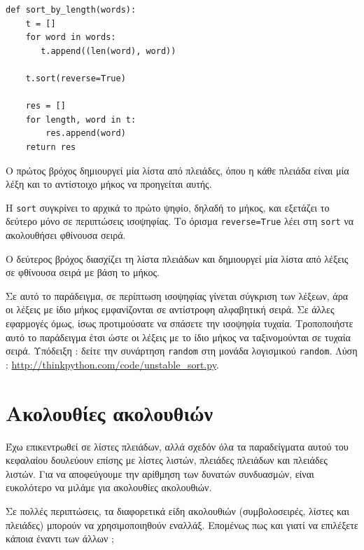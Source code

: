 \documentclass[10pt]{book}
\begin{document}
\begin{verbatim}
def sort_by_length(words):
    t = []
    for word in words:
       t.append((len(word), word))

    t.sort(reverse=True)

    res = []
    for length, word in t:
        res.append(word)
    return res
\end{verbatim}
%
 Ο πρώτος βρόχος δημιουργεί μία λίστα από πλειάδες, όπου η κάθε πλειάδα είναι μία λέξη και το αντίστοιχο μήκος να προηγείται αυτής.

Η  {\tt sort}  συγκρίνει το αρχικά το πρώτο ψηφίο, δηλαδή το μήκος, και εξετάζει το δεύτερο μόνο σε περιπτώσεις ισοψηφίας. Το όρισμα  {\tt reverse=True}  λέει στη  {\tt sort}  να ακολουθήσει φθίνουσα σειρά.

 Ο δεύτερος βρόχος διασχίζει τη λίστα πλειάδων και δημιουργεί μία λίστα από λέξεις σε φθίνουσα σειρά με βάση το μήκος.


\begin{exercise}

Σε αυτό το παράδειγμα, σε περίπτωση ισοψηφίας γίνεται σύγκριση των λέξεων, άρα οι λέξεις με ίδιο μήκος εμφανίζονται σε αντίστροφη αλφαβητική σειρά. Σε άλλες εφαρμογές όμως, ίσως προτιμούσατε να σπάσετε την ισοψηφία τυχαία. Τροποποιήστε αυτό το παράδειγμα έτσι ώστε οι λέξεις με το ίδιο μήκος να ταξινομούνται σε τυχαία σειρά. Υπόδειξη :  δείτε την συνάρτηση  {\tt random}  στη μονάδα λογισμικού  {\tt random}.  Λύση : \url{http://thinkpython.com/code/unstable_sort.py}.
\end{exercise}
 


\section{Ακολουθίες ακολουθιών}

Έχω επικεντρωθεί σε λίστες πλειάδων, αλλά σχεδόν όλα τα παραδείγματα αυτού του κεφαλαίου δουλεύουν επίσης με λίστες λιστών,  πλειάδες πλειάδων και πλειάδες λιστών. Για να αποφεύγουμε την αρίθμηση των δυνατών συνδυασμών, είναι ευκολότερο να μιλάμε για ακολουθίες ακολουθιών.

Σε πολλές περιπτώσεις, τα διαφορετικά είδη ακολουθιών (συμβολοσειρές, λίστες και πλειάδες) μπορούν να χρησιμοποιηθούν εναλλάξ. Επομένως πως και γιατί να επιλέξετε κάποια έναντι των άλλων ;
\end{document}
